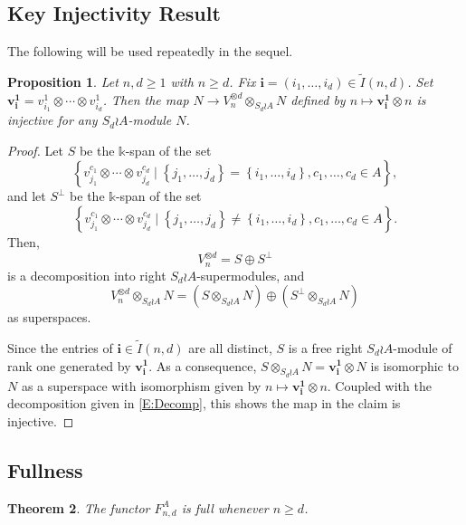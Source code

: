 \documentclass[11pt,reqno]{amsart} %
\newtheorem{theorem}{Theorem}[subsection]
\newtheorem{proposition}[theorem]{Proposition}
\renewcommand{\k}{\mathds{k}}
\newcommand{\0}{\bar{0}}
\newcommand{\1}{\bar{1}}
\newcommand{\wreath}{\wr}
\newcommand{\bv}{\mathbf{v}}
\newcommand{\SdwreathA}{S_{d} \wreath A}
\newcommand{\bi}{\mathbf{i}}
\newcommand{\bone}{\mathbf{1}}
\newcommand{\tI}{\tilde{I}}
\numberwithin{equation}{subsection}
\begin{document}
\subsection{Key Injectivity Result}\label{SS:Key-injectivity-result}  The following will be used repeatedly in the sequel.
\begin{proposition}\label{T:injective-theorem}
Let $n,d \geq 1$ with $n \geq d$.  Fix $\bi = (i_1,\dotsc , i_d) \in \tI(n,d)$.  Set $\bv^{\bone}_{\bi}=v^{1}_{i_1} \otimes \dotsb  \otimes v^{1}_{i_d}$.  Then the map $N \rightarrow V_{n}^{\otimes d}  \otimes_{\SdwreathA} N$ defined by $n \mapsto \bv^{\bone}_{\bi }  \otimes n$ is injective for any $\SdwreathA$-module $N$.
\end{proposition}

\begin{proof} Let $S$ be the $\k$-span of the set
\[
\left\{ v_{j_{1}}^{c_{1}}\otimes \dotsb \otimes v_{j_{d}}^{c_{d}} \mid \left\{j_{1}, \dotsc , j_{d} \right\} = \left\{i_{1}, \dotsc , i_{d} \right\}, c_{1}, \dotsc , c_{d} \in A \right\}, 
\] and let $S^{\perp}$ be the $\k$-span of the set
\[
\left\{ v_{j_{1}}^{c_{1}}\otimes \dotsb \otimes  v_{j_{d}}^{c_{d}} \mid \left\{j_{1}, \dotsc , j_{d} \right\} \neq \left\{i_{1}, \dotsc , i_{d} \right\}, c_{1}, \dotsc , c_{d} \in A \right\}.
\]
Then,
\[
V_{n}^{\otimes d} = S \oplus S^{\perp}
\] is a decomposition into right $\SdwreathA$-supermodules, and  
\begin{equation}\label{E:Decomp}
V_{n}^{\otimes d} \otimes_{\SdwreathA} N = \left( S \otimes_{\SdwreathA} N\right) \oplus \left(  S^{\perp} \otimes_{\SdwreathA} N\right)
\end{equation}
as superspaces.

Since the entries of $\bi \in \tI(n,d)$ are all distinct, $S$ is a free right $\SdwreathA$-module of rank one generated by $\bv^{\bone}_{\bi}$. As a consequence, $S \otimes_{\SdwreathA} N =\bv^{\bone}_{\bi }  \otimes N$ is isomorphic to $N$ as a superspace with isomorphism given by $n \mapsto \bv^{\bone}_{\bi } \otimes n$. Coupled with the decomposition given in \eqref{E:Decomp}, this shows the map in the claim is injective.
\end{proof}

\subsection{Fullness}\label{}

\begin{theorem}\label{T:FullFunctor} The functor $F_{n,d}^{A}$ is full whenever $n \geq d$.
\end{theorem}
\end{document}
